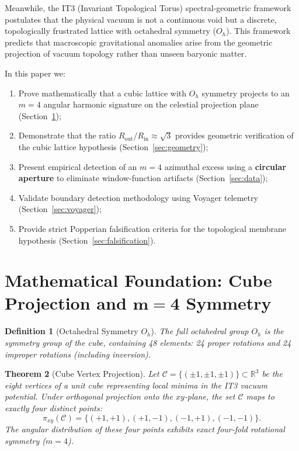 \documentclass[11pt,a4paper]{article}
\newtheorem{theorem}{Theorem}[section]
\newtheorem{definition}[theorem]{Definition}
\theoremstyle{remark}
\newcommand{\Oh}{O_h}
\newcommand{\R}{\mathbb{R}}
\begin{document}
Meanwhile, the IT3 (Invariant Topological Torus) spectral-geometric framework \cite{logvinovich2026it3} postulates that the physical vacuum is not a continuous void but a discrete, topologically frustrated lattice with octahedral symmetry ($\Oh$). This framework predicts that macroscopic gravitational anomalies arise from the geometric projection of vacuum topology rather than unseen baryonic matter.

In this paper we:
\begin{enumerate}
\item Prove mathematically that a cubic lattice with $\Oh$ symmetry projects to an $m=4$ angular harmonic signature on the celestial projection plane (Section~\ref{sec:math});
\item Demonstrate that the ratio $R_{\text{out}}/R_{\text{in}} \approx \sqrt{3}$ provides geometric verification of the cubic lattice hypothesis (Section~\ref{sec:geometry});
\item Present empirical detection of an $m=4$ azimuthal excess using a \textbf{circular aperture} to eliminate window-function artifacts (Section~\ref{sec:data});
\item Validate boundary detection methodology using Voyager telemetry (Section~\ref{sec:voyager});
\item Provide strict Popperian falsification criteria for the topological membrane hypothesis (Section~\ref{sec:falsification}).
\end{enumerate}

\section{Mathematical Foundation: Cube Projection and \texorpdfstring{$\bm{m=4}$}{m=4} Symmetry}
\label{sec:math}

\begin{definition}[Octahedral Symmetry $\Oh$]
The full octahedral group $\Oh$ is the symmetry group of the cube, containing 48 elements: 24 proper rotations and 24 improper rotations (including inversion).
\end{definition}

\begin{theorem}[Cube Vertex Projection]
\label{thm:projection}
Let $\mathcal{C} = \{(\pm 1, \pm 1, \pm 1)\} \subset \R^3$ be the eight vertices of a unit cube representing local minima in the IT3 vacuum potential. Under orthogonal projection onto the $xy$-plane, the set $\mathcal{C}$ maps to exactly four distinct points:
\[
\pi_{xy}(\mathcal{C}) = \{(+1,+1), (+1,-1), (-1,+1), (-1,-1)\}.
\]
The angular distribution of these four points exhibits exact four-fold rotational symmetry ($m=4$).
\end{theorem}
\end{document}
